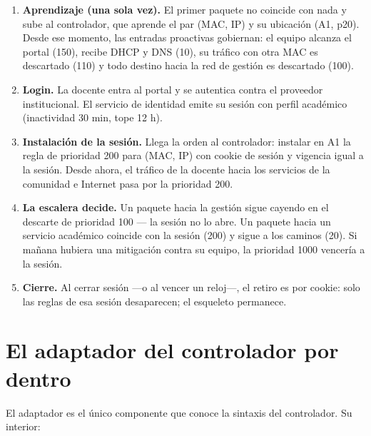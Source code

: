 \documentclass[11pt,a4paper]{article}
\begin{document}
\begin{enumerate}
\item \textbf{Aprendizaje (una sola vez).} El primer paquete no coincide con nada y sube al controlador, que aprende el par (MAC, IP) y su ubicación (A1, p20). Desde ese momento, las entradas proactivas gobiernan: el equipo alcanza el portal (150), recibe DHCP y DNS (10), su tráfico con otra MAC es descartado (110) y todo destino hacia la red de gestión es descartado (100).
\item \textbf{Login.} La docente entra al portal y se autentica contra el proveedor institucional. El servicio de identidad emite su sesión con perfil académico (inactividad 30 min, tope 12 h).
\item \textbf{Instalación de la sesión.} Llega la orden al controlador: instalar en A1 la regla de prioridad 200 para (MAC, IP) con cookie de sesión y vigencia igual a la sesión. Desde ahora, el tráfico de la docente hacia los servicios de la comunidad e Internet pasa por la prioridad 200.
\item \textbf{La escalera decide.} Un paquete hacia la gestión sigue cayendo en el descarte de prioridad 100 --- la sesión no lo abre. Un paquete hacia un servicio académico coincide con la sesión (200) y sigue a los caminos (20). Si mañana hubiera una mitigación contra su equipo, la prioridad 1000 vencería a la sesión.
\item \textbf{Cierre.} Al cerrar sesión ---o al vencer un reloj---, el retiro es por cookie: solo las reglas de esa sesión desaparecen; el esqueleto permanece.
\end{enumerate}

\section{El adaptador del controlador por dentro}

El adaptador es el único componente que conoce la sintaxis del controlador. Su interior:
\end{document}
